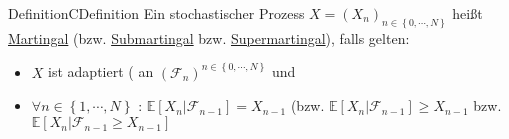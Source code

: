 \begin{ibox}[4.1]{Definition}{CDefinition}
	Ein stochastischer Prozess $ X = \left( X_n \right)_{n \in \left\{  0 , \cdots, N \right\}} $ heißt \underline{Martingal} (bzw.
	\underline{Submartingal} bzw. \underline{Supermartingal}), falls gelten: 
	\begin{itemize}
		\item $ X $ ist adaptiert ( an $ \left( \mathcal{F}_{n} \right)^{n \in \left\{ 0 , \cdots, N \right\}} $ und 
		\item $ \forall n \in \left\{  1 , \cdots, N \right\} $ : $ \mathbb{E} \left[ X_n | \mathcal{F}_{n-1} \right] = X_{n-1} $ (bzw. 
			$ \mathbb{E} \left[ X_n | \mathcal{F}_{n-1} \right] \geq  X_{n-1}$ bzw. $ \mathbb{E} \left[ X_n | \mathcal{F}_{n-1} \geq X_{n-1} \right] $ 
	\end{itemize}
\end{ibox}

